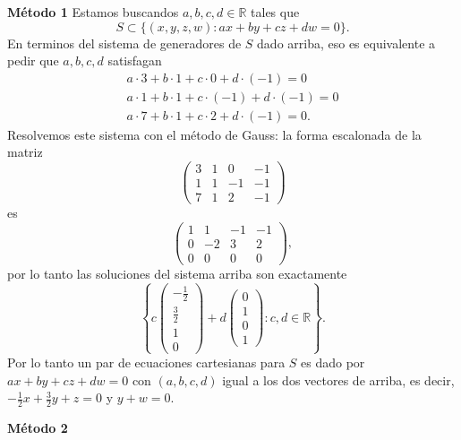 \documentclass[12pt,a4paper]{report}
\theoremstyle{definition}
\newcommand{\RR}{\ensuremath{\mathbb R}}
\begin{document}
{\bf M\'etodo 1}
Estamos buscandos $a,b,c,d\in \RR$ tales que $$S\subset \{(x,y,z,w):ax+by+cz+dw=0\}.$$ En terminos del sistema de generadores de $S$ dado arriba,  eso es equivalente  a pedir que $a,b,c,d$ satisfagan
 \begin{align*}
a\cdot 3+b\cdot 1+c\cdot 0+d\cdot(-1)=0\\
a\cdot 1+b\cdot 1+c\cdot (-1)+d\cdot(-1)=0\\
a\cdot 7+b\cdot 1+c\cdot 2+d\cdot(-1)=0.
\end{align*}
Resolvemos este sistema con el m\'etodo de Gauss: la forma escalonada de la matriz 
$$\left(\begin{array}{cccc}3 & 1 & 0 & -1 \\1 & 1 & -1 & -1 \\7 & 1 & 2 & -1\end{array}\right)$$ es
$$\left(\begin{array}{cccc}1 & 1 & -1 & -1 \\0 & -2 & 3 & 2 \\0 & 0 & 0 & 0\end{array}\right),$$
por lo tanto las soluciones del sistema arriba son exactamente 
$$\left\{c
\left(\begin{array}{c}-\frac{1}{2} \\\frac{3}{2} \\1 \\0\end{array}\right)
+
d
\left(\begin{array}{c}0 \\1 \\0 \\1\end{array}\right):c,d\in \RR\right\}.$$
Por lo tanto un par de ecuaciones cartesianas para $S$ es dado por 
$ax+by+cz+dw=0$ con $(a,b,c,d)$ igual a los dos vectores de arriba,
es decir,
$-\frac{1}{2}x+\frac{3}{2}y+z=0$ y $y+w=0$.

\bigskip

{\bf M\'etodo 2}
\end{document}
